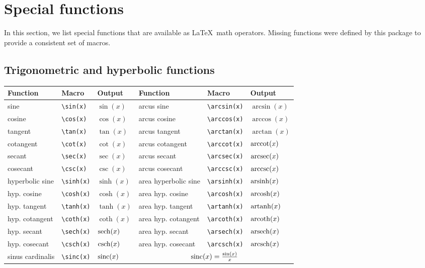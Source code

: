 \documentclass[DIV=13]{scrartcl}
\begin{document}
\section{Special functions}
In this section, we list special functions that are available as \LaTeX\
math operators. Missing functions were defined by this package to provide
a consistent set of macros.
\subsection{Trigonometric and hyperbolic functions}
\begin{center}
  \begin{tabular}{lll|lll}
    \toprule
    \textbf{Function}    & \textbf{Macro}    & \textbf{Output} &
    \textbf{Function}    & \textbf{Macro}    & \textbf{Output}   \\
    \midrule
    sine                 & \verb|\sin(x)|    & $\sin(x)$       &
    arcus sine           & \verb|\arcsin(x)| & $\arcsin(x)$      \\
    cosine               & \verb|\cos(x)|    & $\cos(x)$       &
    arcus cosine         & \verb|\arccos(x)| & $\arccos(x)$      \\
    tangent              & \verb|\tan(x)|    & $\tan(x)$       &
    arcus tangent        & \verb|\arctan(x)| & $\arctan(x)$      \\
    cotangent            & \verb|\cot(x)|    & $\cot(x)$       &
    arcus cotangent      & \verb|\arccot(x)| & $\operatorname{arccot}(x)$      \\
    secant               & \verb|\sec(x)|    & $\sec(x)$       &
    arcus secant         & \verb|\arcsec(x)| & $\operatorname{arcsec}(x)$      \\
    cosecant             & \verb|\csc(x)|    & $\csc(x)$       &
    arcus cosecant       & \verb|\arccsc(x)| & $\operatorname{arccsc}(x)$      \\
    \midrule
    hyperbolic sine      & \verb|\sinh(x)|   & $\sinh(x)$      &
    area hyperbolic sine & \verb|\arsinh(x)| & $\operatorname{arsinh}(x)$      \\
    hyp. cosine          & \verb|\cosh(x)|   & $\cosh(x)$      &
    area hyp. cosine     & \verb|\arcosh(x)| & $\operatorname{arcosh}(x)$      \\
    hyp. tangent         & \verb|\tanh(x)|   & $\tanh(x)$      &
    area hyp. tangent    & \verb|\artanh(x)| & $\operatorname{artanh}(x)$      \\
    hyp. cotangent       & \verb|\coth(x)|   & $\coth(x)$      &
    area hyp. cotangent  & \verb|\arcoth(x)| & $\operatorname{arcoth}(x)$      \\
    hyp. secant          & \verb|\sech(x)|   & $\operatorname{sech}(x)$      &
    area hyp. secant     & \verb|\arsech(x)| & $\operatorname{arsech}(x)$      \\
    hyp. cosecant        & \verb|\csch(x)|   & $\operatorname{csch}(x)$      &
    area hyp. cosecant   & \verb|\arcsch(x)| & $\operatorname{arcsch}(x)$      \\
    \midrule
    sinus cardinalis     & \verb|\sinc(x)|   & $\operatorname{sinc}(x)$      &
    \multicolumn{3}{c}{$\operatorname{sinc}(x) = \frac{\sin(x)}{x}$}           \\
    \bottomrule
  \end{tabular}
\end{center}
\end{document}
